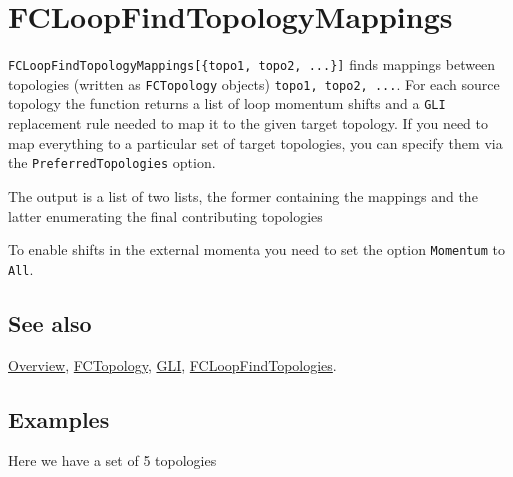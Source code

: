 \documentclass[../FeynCalcManual.tex]{subfiles}
\begin{document}
\hypertarget{fcloopfindtopologymappings}{
\section{FCLoopFindTopologyMappings}\label{fcloopfindtopologymappings}}

\texttt{FCLoopFindTopologyMappings[\allowbreak{}\{\allowbreak{}topo1,\ \allowbreak{}topo2,\ \allowbreak{}...\}]}
finds mappings between topologies (written as \texttt{FCTopology}
objects) \texttt{topo1,\ \allowbreak{}topo2,\ \allowbreak{}...}. For
each source topology the function returns a list of loop momentum shifts
and a \texttt{GLI} replacement rule needed to map it to the given target
topology. If you need to map everything to a particular set of target
topologies, you can specify them via the \texttt{PreferredTopologies}
option.

The output is a list of two lists, the former containing the mappings
and the latter enumerating the final contributing topologies

To enable shifts in the external momenta you need to set the option
\texttt{Momentum} to \texttt{All}.

\subsection{See also}

\hyperlink{toc}{Overview}, \hyperlink{fctopology}{FCTopology},
\hyperlink{gli}{GLI},
\hyperlink{fcloopfindtopologies}{FCLoopFindTopologies}.

\subsection{Examples}

Here we have a set of 5 topologies
\end{document}
